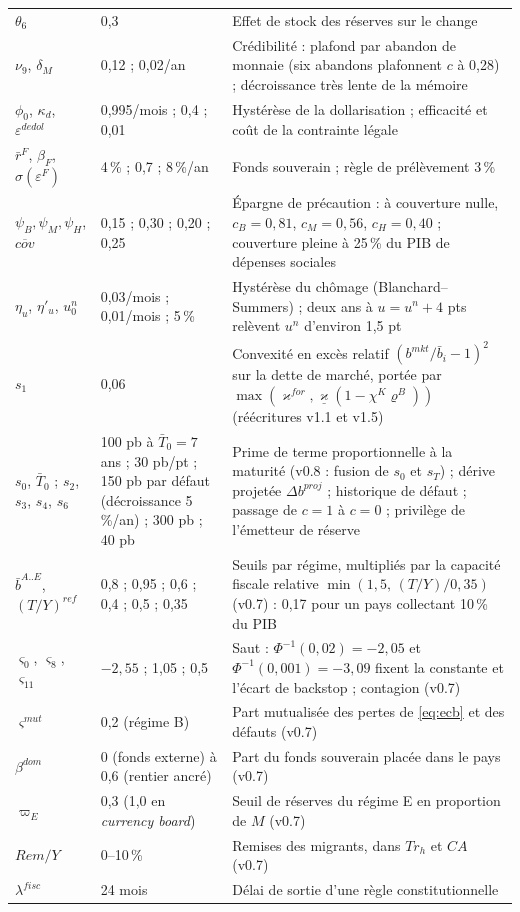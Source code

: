 \documentclass[11pt,a4paper]{article}
\begin{document}
\begin{center}
\begin{longtable}{p{4.2cm}p{3.0cm}p{7.6cm}}
$\theta_6$ & 0,3 & Effet de stock des réserves sur le change\\
$\nu_9$, $\delta_M$ & 0,12 ; 0,02/an & Crédibilité : plafond par abandon de monnaie (six abandons plafonnent $c$ à 0,28) ; décroissance très lente de la mémoire\\
$\phi_0$, $\kappa_d$, $\varepsilon^{dedol}$ & 0,995/mois ; 0,4 ; 0,01 & Hystérèse de la dollarisation ; efficacité et coût de la contrainte légale\\
$\bar r^F$, $\beta_F$, $\sigma(\varepsilon^F)$ & 4\,\% ; 0,7 ; 8\,\%/an & Fonds souverain ; règle de prélèvement 3\,\%\\
$\psi_B, \psi_M, \psi_H$, $\overline{cov}$ & 0,15 ; 0,30 ; 0,20 ; 0,25 & Épargne de précaution : à couverture nulle, $c_B=0{,}81$, $c_M=0{,}56$, $c_H=0{,}40$ ; couverture pleine à 25\,\% du PIB de dépenses sociales\\
$\eta_u$, $\eta'_u$, $u^n_0$ & 0,03/mois ; 0,01/mois ; 5\,\% & Hystérèse du chômage (Blanchard--Summers) ; deux ans à $u=u^n+4$ pts relèvent $u^n$ d'environ 1,5 pt\\
$s_1$ & 0,06 & Convexité en excès relatif $(b^{mkt}/\bar b_i-1)^2$ sur la dette de marché, portée par $\max(\varkappa^{for},\underline\varkappa(1-\chi^K\varrho^B))$ (réécritures v1.1 et v1.5)\\
$s_0$, $\bar T_0$ ; $s_2$, $s_3$, $s_4$, $s_6$ & 100 pb à $\bar T_0=7$ ans ; 30 pb/pt ; 150 pb par défaut (décroissance 5\,\%/an) ; 300 pb ; 40 pb & Prime de terme proportionnelle à la maturité (v0.8 : fusion de $s_0$ et $s_T$) ; dérive projetée $\Delta b^{proj}$ ; historique de défaut ; passage de $c=1$ à $c=0$ ; privilège de l'émetteur de réserve\\
$\bar b^{A..E}$, $(T/Y)^{ref}$ & 0,8 ; 0,95 ; 0,6 ; 0,4 ; 0,5 ; 0,35 & Seuils par régime, multipliés par la capacité fiscale relative $\min(1{,}5,\,(T/Y)/0{,}35)$ (v0.7) : 0,17 pour un pays collectant 10\,\% du PIB\\
$\varsigma_0$, $\varsigma_8$, $\varsigma_{11}$ & $-2{,}55$ ; 1,05 ; 0,5 & Saut : $\Phi^{-1}(0{,}02)=-2{,}05$ et $\Phi^{-1}(0{,}001)=-3{,}09$ fixent la constante et l'écart de backstop ; contagion (v0.7)\\
$\varsigma^{mut}$ & 0,2 (régime B) & Part mutualisée des pertes de \eqref{eq:ecb} et des défauts (v0.7)\\
$\beta^{dom}$ & 0 (fonds externe) à 0,6 (rentier ancré) & Part du fonds souverain placée dans le pays (v0.7)\\
$\varpi_E$ & 0,3 (1,0 en \emph{currency board}) & Seuil de réserves du régime E en proportion de $M$ (v0.7)\\
$Rem/Y$ & 0--10\,\% & Remises des migrants, dans $Tr_h$ et $CA$ (v0.7)\\
$\lambda^{fisc}$ & 24 mois & Délai de sortie d'une règle constitutionnelle\\


\end{longtable}
\end{center}
\end{document}
